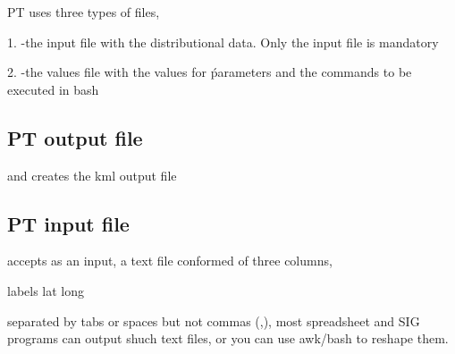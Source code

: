 PT uses three types of files,

1. -the input file with the distributional data. Only the input file is mandatory
	
2. -the values file with the values for ṕarameters  and the commands to be executed in bash 
	

\subsection*{PT output file}
	
and creates the kml output file


\subsection*{PT input file}

\mt accepts as an input, a text file conformed of three columns,
	
	labels   lat   long
	

separated by tabs or spaces but not commas (,), most spreadsheet and SIG programs can output shuch text files, or you can use awk/bash to reshape them. 


\label{valid_data_set}

\vspace{-7\baselineskip}
\vspace{7\baselineskip}
	
